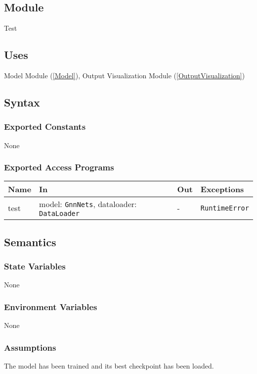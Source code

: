 \documentclass[12pt, titlepage]{article}
\begin{document}
\subsection{Module}
Test

\subsection{Uses}
Model Module (\ref{Model}), Output Visualization Module (\ref{OutputVisualization})

\subsection{Syntax}

\subsubsection{Exported Constants}
None

\subsubsection{Exported Access Programs}

\begin{center}
\begin{tabular}{p{2cm} p{6cm} p{4cm} p{3.5cm}}
\hline
\textbf{Name} & \textbf{In} & \textbf{Out} & \textbf{Exceptions} \\
\hline
test & model: \texttt{GnnNets}, dataloader: \texttt{DataLoader} & - & \texttt{RuntimeError} \\
\hline
\end{tabular}
\end{center}

\subsection{Semantics}

\subsubsection{State Variables}
None

\subsubsection{Environment Variables}
None

\subsubsection{Assumptions}
The model has been trained and its best checkpoint has been loaded.
\end{document}
